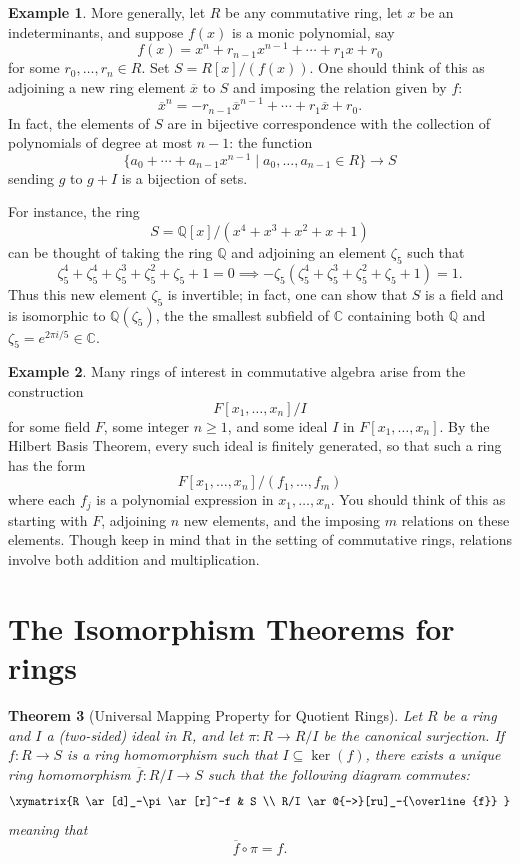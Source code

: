 \documentclass[12pt]{report}
\newtheorem{theorem}{Theorem}[chapter]
\numberwithin{equation}{section}
\numberwithin{theorem}{chapter}
\theoremstyle{definition}
\newtheorem{example}[theorem]{Example}
\newtheorem*{basic properties}{Basic Properties}
\newtheorem*{Important Remark}{Important Remark}
\newcommand{\Q}{\mathbb{Q}}
\newcommand{\C}{\mathbb{C}}
\renewcommand{\ker}{\operatorname{ker}}
\begin{document}
\begin{example}\label{example quotient with zeta5}
More generally, let $R$ be any commutative ring, let $x$ be an indeterminants, and suppose $f(x)$ is a monic polynomial, say
$$f(x) = x^n + r_{n-1} x^{n-1} + \cdots  + r_1 x + r_0$$ 
for some $r_0, \dots, r_n \in R$. Set $S = R[x]/(f(x))$. One should think of this as adjoining a new ring element $\overline{x}$ to $S$ and imposing the relation given by $f$:
$$\overline{x}^n = - r_{n-1} \overline{x}^{n-1} + \cdots  + r_1 \overline{x} + r_0.$$
In fact, the elements of $S$ are in bijective correspondence with the collection of polynomials of degree at most $n-1$: the function 
$$\{a_0 + \cdots + a_{n-1}x^{n-1} \mid a_0, \dots, a_{n-1} \in R\} \longrightarrow S$$ 
sending $g$ to $g + I$ is a bijection of sets. 

For instance, the ring 
$$S = \Q[x]/(x^4+x^3+x^2+x+1)$$
can be thought of taking the ring $\Q$ and adjoining an element $\zeta_5$ such that
$$\zeta_5^4 + \zeta_5^4 + \zeta_5^3 + \zeta_5^2 + \zeta_5 + 1 = 0 \implies -\zeta_5(\zeta_5^4 + \zeta_5^3 + \zeta_5^2 + \zeta_5 + 1) = 1.$$
Thus this new element $\zeta_5$ is invertible; in fact, one can show that $S$ is a field and is isomorphic to $\Q(\zeta_5)$, the the smallest subfield of $\C$ containing both $\Q$ and $\zeta_5 = e^{2\pi i/5} \in \C$. 
 \end{example}



  
\begin{example} 
Many rings of interest in commutative algebra arise from the construction 
$$F[x_1, \dots, x_n]/I$$
for some field $F$, some integer $n \geqslant 1$, and some ideal $I$ in $F[x_1, \ldots, x_n]$. By the Hilbert Basis Theorem, every such ideal is finitely generated, so that such a ring has the form
$$F[x_1, \dots, x_n]/(f_1, \dots, f_m)$$
where each $f_j$ is a polynomial expression in $x_1, \dots, x_n$. You should think of this as starting with $F$, adjoining $n$ new elements, and the imposing $m$ relations on these elements. Though keep in mind that in the setting of commutative rings, relations involve both addition and multiplication.
 \end{example}




\section{The Isomorphism Theorems for rings}

\begin{theorem}[Universal Mapping Property for Quotient Rings]\label{UMP quotient rings}
Let $R$ be a ring and $I$ a (two-sided) ideal in $R$, and let $\pi: R \to R/I$ be the canonical surjection.
If $f\!: R \to S$ is a ring homomorphism such that $I \subseteq \ker(f)$, there exists a unique ring homomorphism $\overline{f}: R/I \to S$ such that the following diagram commutes:
$$\xymatrix{R \ar[d]_-\pi \ar[r]^-f & S \\ R/I \ar@{-->}[ru]_-{\overline{f}} }$$
meaning that
$$\overline{f} \circ \pi = f.$$ 
\end{theorem}
\end{document}
